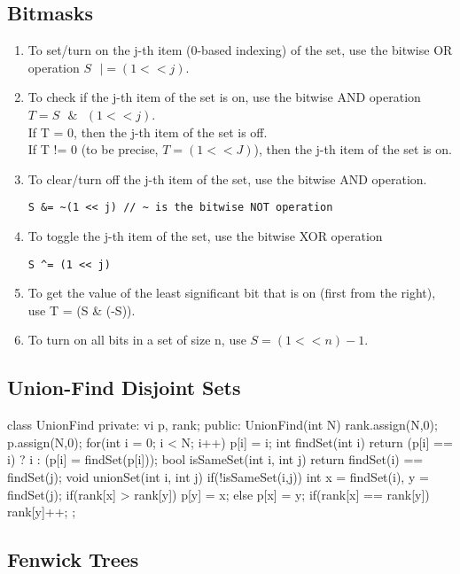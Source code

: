 \documentclass{article}
\begin{document}
\subsection{Bitmasks}
\begin{enumerate}
\item To set/turn on the j-th item (0-based indexing) of the set, use the bitwise OR operation $S\text{ }|= (1 << j)$.
\item To check if the j-th item of the set is on, use the bitwise AND operation $T = S\text{ }\&\text{ }(1 << j)$.\\
If T = 0, then the j-th item of the set is off.\\
If T != 0 (to be precise, $T = (1<<J)$), then the j-th item of the set is on.
\item To clear/turn off the j-th item of the set, use the bitwise AND operation.
\begin{lstlisting}
S &= ~(1 << j) // ~ is the bitwise NOT operation
\end{lstlisting}
\item To toggle the j-th item of the set, use the bitwise XOR operation
\begin{lstlisting}
S ^= (1 << j)
\end{lstlisting}
\item To get the value of the least significant bit that is on (first from the right), use T = (S \& (-S)).
\item To turn on all bits in a set of size n, use $S = (1 << n ) - 1$.
\end{enumerate}

\subsection{Union-Find Disjoint Sets}
\begin{mylisting}{}
class UnionFind{
	private: vi p, rank;
	public:
		UnionFind(int N) {
			rank.assign(N,0); p.assign(N,0);
			for(int i = 0; i < N; i++) p[i] = i;
		}
		int findSet(int i){
			return (p[i] == i) ? i : (p[i] = findSet(p[i]));
		}
		bool isSameSet(int i, int j){
			return findSet(i) == findSet(j);
		}
		void unionSet(int i, int j){
			if(!isSameSet(i,j)){
				int x = findSet(i), y = findSet(j);
				if(rank[x] > rank[y]) p[y] = x;
	    		else{
					p[x] = y;
					if(rank[x] == rank[y]) rank[y]++;
}}}};
\end{mylisting}

\subsection{Fenwick Trees}
\end{document}

